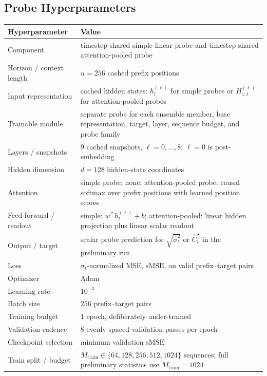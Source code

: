 \documentclass[11pt]{article}
\begin{document}
\subsection{Probe Hyperparameters}

\begin{table}[H]
\centering
\small
\renewcommand{\arraystretch}{1.18}
\begin{tabular}{p{} p{}}
\hline
Hyperparameter & Value \\
\hline
Component & timestep-shared simple linear probe and timestep-shared attention-pooled probe \\
Horizon / context length & \(n=256\) cached prefix positions \\
Input representation & cached hidden states: \(h_t^{(\ell)}\) for simple probes or \(H_{1:t}^{(\ell)}\) for attention-pooled probes \\
Trainable module & separate probe for each ensemble member, base representation, target, layer, sequence budget, and probe family \\
Layers / snapshots & \(9\) cached snapshots, \(\ell=0,\ldots,8\); \(\ell=0\) is post-embedding \\
Hidden dimension & \(d=128\) hidden-state coordinates \\
Attention & simple probe: none; attention-pooled probe: causal softmax over prefix positions with learned position scores \\
Feed-forward / readout & simple: \(w^\top h_t^{(\ell)}+b\); attention-pooled: linear hidden projection plus linear scalar readout \\
Output / target & scalar probe prediction for \(\sqrt{\hat\sigma_t^2}\) or \(\widehat C_t^\star\) in the preliminary run \\
Loss & \(\sigma_i\)-normalized MSE, \(\mathrm{sMSE}\), on valid prefix--target pairs \\
Optimizer & Adam \\
Learning rate & \(10^{-3}\) \\
Batch size & \(256\) prefix--target pairs \\
Training budget & \(1\) epoch, deliberately under-trained \\
Validation cadence & \(8\) evenly spaced validation passes per epoch \\
Checkpoint selection & minimum validation \(\mathrm{sMSE}\) \\
Train split / budget & \(M_{\mathrm{train}}\in\{64,128,256,512,1024\}\) sequences; full preliminary statistics use \(M_{\mathrm{train}}=1024\) \\

\end{tabular}
\end{table}
\end{document}

